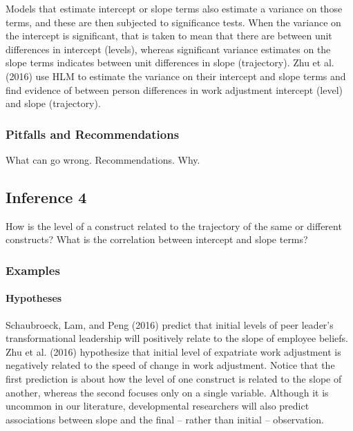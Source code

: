 \documentclass[english,,man]{apa6}
\let\oldparagraph\paragraph
\renewcommand{\paragraph}[1]{\oldparagraph{#1}\mbox{}}
\theoremstyle{definition}
\theoremstyle{definition}
\theoremstyle{definition}
\theoremstyle{remark}
\begin{document}
Models that estimate intercept or slope terms also estimate a variance
on those terms, and these are then subjected to significance tests. When
the variance on the intercept is significant, that is taken to mean that
there are between unit differences in intercept (levels), whereas
significant variance estimates on the slope terms indicates between unit
differences in slope (trajectory). Zhu et al. (2016) use HLM to estimate
the variance on their intercept and slope terms and find evidence of
between person differences in work adjustment intercept (level) and
slope (trajectory).

\hypertarget{pitfalls-and-recommendations-3}{%
\subsubsection{Pitfalls and
Recommendations}\label{pitfalls-and-recommendations-3}}

What can go wrong. Recommendations. Why.

\hypertarget{inference-4}{%
\subsection{Inference 4}\label{inference-4}}

How is the level of a construct related to the trajectory of the same or
different constructs? What is the correlation between intercept and
slope terms?

\hypertarget{examples-4}{%
\subsubsection{Examples}\label{examples-4}}

\hypertarget{hypotheses-4}{%
\paragraph{Hypotheses}\label{hypotheses-4}}

Schaubroeck, Lam, and Peng (2016) predict that initial levels of peer
leader's transformational leadership will positively relate to the slope
of employee beliefs. Zhu et al. (2016) hypothesize that initial level of
expatriate work adjustment is negatively related to the speed of change
in work adjustment. Notice that the first prediction is about how the
level of one construct is related to the slope of another, whereas the
second focuses only on a single variable. Although it is uncommon in our
literature, developmental researchers will also predict associations
between slope and the final -- rather than initial -- observation.
\end{document}
